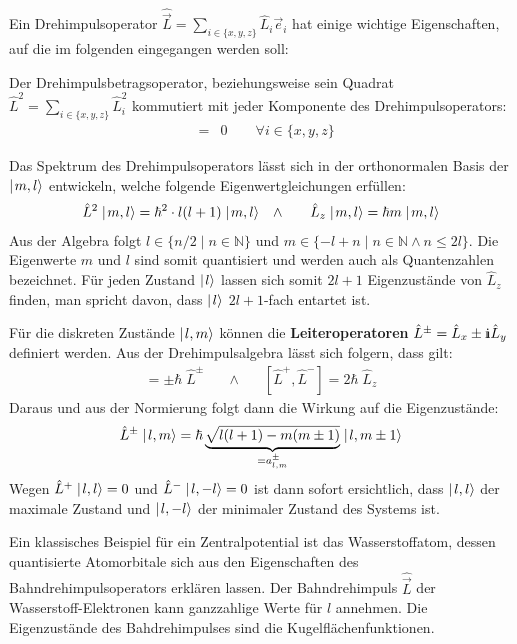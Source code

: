 Ein Drehimpulsoperator $\hat{\vec{L}}=\sum_{i\in\{x,y,z\}}\hat{L}_i \vec{e}_i$ hat einige wichtige Eigenschaften, auf die im folgenden eingegangen werden soll: 
\begin{itemize1}
	\item Der Drehimpulsbetragsoperator, beziehungsweise sein Quadrat $\hat{L}^2=\sum_{i\in\{x,y,z\}}\hat{L}_i^2$ kommutiert mit jeder Komponente des Drehimpulsoperators: 
	\begin{eqnarray*}
		[\hat{L}^2,\hat{L}_i] &=& 0 \qquad\forall i\in\{x,y,z\}
	\end{eqnarray*}
	\item Das Spektrum des Drehimpulsoperators lässt sich in der orthonormalen Basis der $\mid\!\!\!\,\,{m,l}\rangle$ entwickeln, welche folgende Eigenwertgleichungen erfüllen: 
	\begin{eqnarray*}
		\hat{L}^2 \ket{m,l} = \hbar^2\cdot l(l+1) \ket{m,l} &\quad\land\quad& \hat{L}_z \ket{m,l} = \hbar m\ket{m,l}
	\end{eqnarray*}
	Aus der Algebra folgt $l\in\{n/2\;\big|\; n\in\mathbb{N}\}$ und $m\in\{-l+n\;\big|\; n\in\mathbb{N}\land n\leq 2l\}$. Die Eigenwerte $m$ und $l$ sind somit quantisiert und werden auch als Quantenzahlen bezeichnet. Für jeden Zustand $\mid\!\!\!\,\,{l}\rangle$ lassen sich somit $2l+1$ Eigenzustände von $\hat{L}_z$ finden, man spricht davon, dass $\mid\!\!\!\,\,{l}\rangle$ $2l+1$-fach entartet ist. 
	\item Für die diskreten Zustände $\mid\!\!\!\,\,{l,m}\rangle$ können die  {\bf Leiteroperatoren} $\hat{L}^{\pm} = \hat{L}_x \pm \I\hat{L}_y$ definiert werden. Aus der Drehimpulsalgebra lässt sich folgern, dass gilt: 
	\begin{eqnarray*}
		[\hat{L}_z,\hat{L}^{\pm}] = \pm\hbar\;\hat{L}^{\pm} &\quad\land\quad& [\hat{L}^+,\hat{L}^-] = 2\hbar\;\hat{L}_z
	\end{eqnarray*}
	Daraus und aus der Normierung folgt dann die Wirkung auf die Eigenzustände: 
	\begin{eqnarray*}
		\hat{L}^{\pm}\mid\!\!\!\,\,{l,m}\rangle = \hbar \underbrace{\sqrt{l(l+1)-m(m\pm1)}}_{=a_{l,m}^{\pm}}\mid\!\!\!\,\,{l,m\pm1}\rangle
	\end{eqnarray*}
	Wegen $\hat{L}^+\mid\!\!\!\,\,{l,l}\rangle=0$ und $\hat{L}^-\mid\!\!\!\,\,{l,-l}\rangle=0$ ist dann sofort ersichtlich, dass $\mid\!\!\!\,\,{l,l}\rangle$ der maximale Zustand und $\mid\!\!\!\,\,{l,-l}\rangle$ der minimaler Zustand des Systems ist. 
\end{itemize1}

Ein klassisches Beispiel für ein Zentralpotential ist das Wasserstoffatom, dessen quantisierte Atomorbitale sich aus den Eigenschaften des Bahndrehimpulsoperators erklären lassen. Der Bahndrehimpuls $\hat{\vec{L}}$ der Wasserstoff-Elektronen kann ganzzahlige Werte für $l$ annehmen. Die Eigenzustände des Bahdrehimpulses sind die Kugelflächenfunktionen. 

